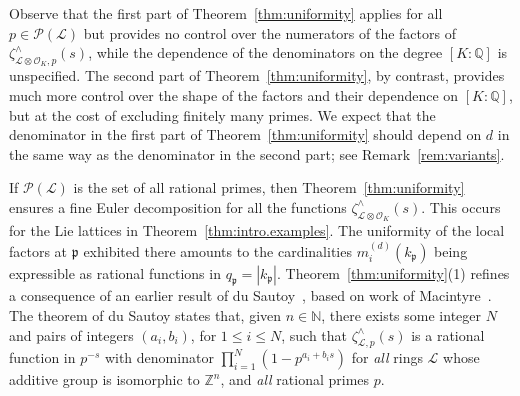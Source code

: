 \documentclass[11pt,a4paper]{amsart}
\theoremstyle{plain}
\theoremstyle{remark}
\newcommand{\N}{\mathbb{N}}
\newcommand{\Z}{\mathbb{Z}}
\newcommand{\Q}{\mathbb{Q}}
\newcommand{\tensor}{\otimes}
\newcommand{\p}{\mathfrak{p}}
\def \p {\ensuremath{\mathfrak{p}}}
\begin{document}
Observe that the first part of Theorem~\ref{thm:uniformity} applies for all $p \in \mathcal{P}(\mathcal{L})$ but provides no control over the numerators of the factors of $ \zeta^\wedge_{\mathcal{L} \tensor \mathcal{O}_K, p}(s)$, while the dependence of the denominators  on the degree $[K:\Q]$ is unspecified.  The second part of Theorem~\ref{thm:uniformity}, by contrast, provides much more control over the shape of the factors and their dependence on $[K : \Q]$, but at the cost of excluding finitely many primes.  We expect that the denominator in the first part of Theorem~\ref{thm:uniformity} should depend on $d$ in the same way as the denominator in the second part; see Remark~\ref{rem:variants}.

If $\mathcal{P}(\mathcal{L})$ is the set of all rational primes, then Theorem~\ref{thm:uniformity} ensures a fine Euler decomposition for all the functions $\zeta^\wedge_{\mathcal{L} \tensor \mathcal{O}_K}(s)$.  This occurs for the Lie lattices in Theorem~\ref{thm:intro.examples}.  The
uniformity of the local factors at $\p$ exhibited there amounts to the cardinalities $m_i^{(d)}(k_\p)$ being expressible as rational functions in $q_\p = |k_\p |$.  Theorem~\ref{thm:uniformity}(1) refines a consequence of an earlier result of du Sautoy~\cite[Corollary~3.3]{duS/94}, based on work of Macintyre~\cite{Macintyre/90}.  
The theorem of du Sautoy states that, given $n \in \N$, there exists some integer $N$ and pairs of integers $(a_i, b_i)$, for $1 \leq i \leq N$, such that $\zeta^\wedge_{\mathcal{L},p}(s)$ is a rational function in $p^{-s}$ with denominator $\prod_{i = 1}^N (1 - p^{a_i + b_is})$ for {\emph{all}} rings $\mathcal{L}$ whose additive group is isomorphic to $\Z^n$, and {\emph{all}} rational primes $p$.  
\end{document}
